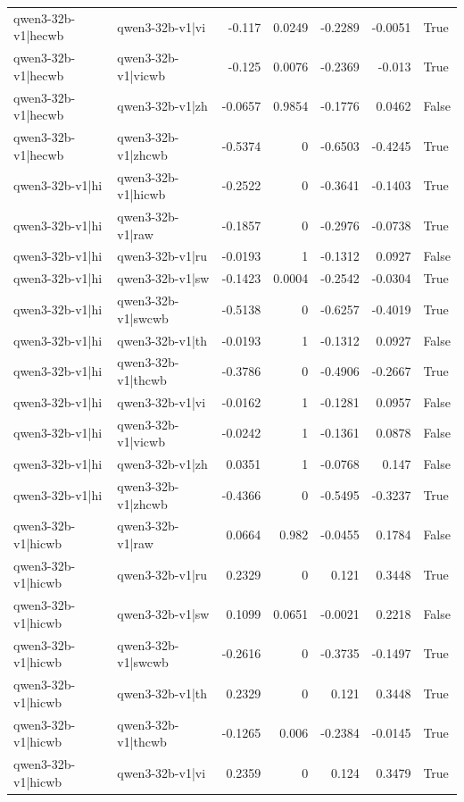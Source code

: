 \begin{table}
\begin{tabular}{l l r r r r l}
qwen3-32b-v1|hecwb & qwen3-32b-v1|vi & -0.117 & 0.0249 & -0.2289 & -0.0051 & True \\
qwen3-32b-v1|hecwb & qwen3-32b-v1|vicwb & -0.125 & 0.0076 & -0.2369 & -0.013 & True \\
qwen3-32b-v1|hecwb & qwen3-32b-v1|zh & -0.0657 & 0.9854 & -0.1776 & 0.0462 & False \\
qwen3-32b-v1|hecwb & qwen3-32b-v1|zhcwb & -0.5374 & 0 & -0.6503 & -0.4245 & True \\
qwen3-32b-v1|hi & qwen3-32b-v1|hicwb & -0.2522 & 0 & -0.3641 & -0.1403 & True \\
qwen3-32b-v1|hi & qwen3-32b-v1|raw & -0.1857 & 0 & -0.2976 & -0.0738 & True \\
qwen3-32b-v1|hi & qwen3-32b-v1|ru & -0.0193 & 1 & -0.1312 & 0.0927 & False \\
qwen3-32b-v1|hi & qwen3-32b-v1|sw & -0.1423 & 0.0004 & -0.2542 & -0.0304 & True \\
qwen3-32b-v1|hi & qwen3-32b-v1|swcwb & -0.5138 & 0 & -0.6257 & -0.4019 & True \\
qwen3-32b-v1|hi & qwen3-32b-v1|th & -0.0193 & 1 & -0.1312 & 0.0927 & False \\
qwen3-32b-v1|hi & qwen3-32b-v1|thcwb & -0.3786 & 0 & -0.4906 & -0.2667 & True \\
qwen3-32b-v1|hi & qwen3-32b-v1|vi & -0.0162 & 1 & -0.1281 & 0.0957 & False \\
qwen3-32b-v1|hi & qwen3-32b-v1|vicwb & -0.0242 & 1 & -0.1361 & 0.0878 & False \\
qwen3-32b-v1|hi & qwen3-32b-v1|zh & 0.0351 & 1 & -0.0768 & 0.147 & False \\
qwen3-32b-v1|hi & qwen3-32b-v1|zhcwb & -0.4366 & 0 & -0.5495 & -0.3237 & True \\
qwen3-32b-v1|hicwb & qwen3-32b-v1|raw & 0.0664 & 0.982 & -0.0455 & 0.1784 & False \\
qwen3-32b-v1|hicwb & qwen3-32b-v1|ru & 0.2329 & 0 & 0.121 & 0.3448 & True \\
qwen3-32b-v1|hicwb & qwen3-32b-v1|sw & 0.1099 & 0.0651 & -0.0021 & 0.2218 & False \\
qwen3-32b-v1|hicwb & qwen3-32b-v1|swcwb & -0.2616 & 0 & -0.3735 & -0.1497 & True \\
qwen3-32b-v1|hicwb & qwen3-32b-v1|th & 0.2329 & 0 & 0.121 & 0.3448 & True \\
qwen3-32b-v1|hicwb & qwen3-32b-v1|thcwb & -0.1265 & 0.006 & -0.2384 & -0.0145 & True \\
qwen3-32b-v1|hicwb & qwen3-32b-v1|vi & 0.2359 & 0 & 0.124 & 0.3479 & True \\

\end{tabular}
\end{table}
